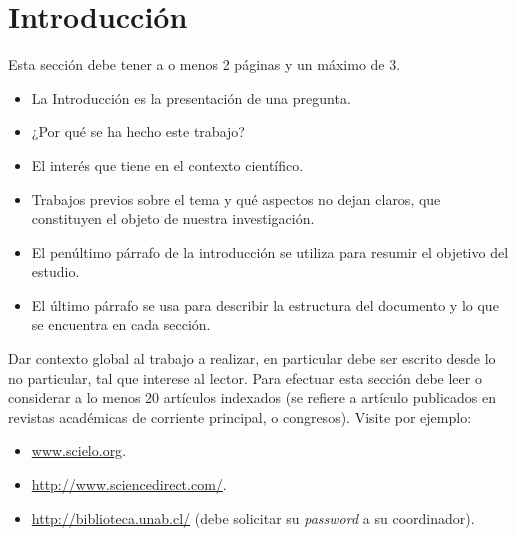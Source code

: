 \chapter{Introducción}
\label{cha:intro}


Esta sección debe tener a o menos 2 páginas  y un máximo de 3.

\begin{itemize}
	\item La Introducción es la presentación de una pregunta.
	\item ¿Por qué se ha hecho este trabajo? 
	\item  El interés que tiene en el contexto científico.
	\item  Trabajos previos sobre el tema y qué aspectos no dejan claros, que constituyen el objeto de nuestra investigación.
	\item El penúltimo párrafo de la introducción se utiliza para resumir el objetivo del estudio.
	\item El último párrafo se usa para describir la estructura del documento y lo que se encuentra en cada sección.
\end{itemize}

Dar contexto global al trabajo a realizar, en particular debe ser escrito desde lo no particular, tal que interese al lector. Para efectuar esta sección debe leer o considerar a lo menos 20 artículos indexados (se refiere a artículo publicados en revistas académicas de corriente principal, o congresos). Visite por ejemplo:
\begin{itemize}
	\item \url{www.scielo.org}.
	\item \url{http://www.sciencedirect.com/}.
	\item \url{http://biblioteca.unab.cl/} (debe solicitar su \textit{password} a su coordinador).
\end{itemize}


